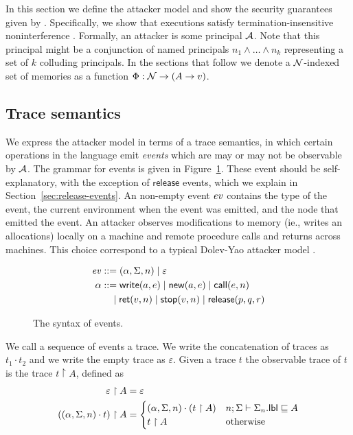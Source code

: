 In this section we define the attacker model and show the security guarantees given by \lang. Specifically, we show that \lang{} executions satisfy termination-insensitive noninterference \cite{4223226}. Formally, an attacker is some principal $\mathcal{A}$. Note that this principal might be a conjunction of named principals $n_1 \wedge \dots \wedge n_k$ representing a set of $k$ colluding principals. In the sections that follow we denote a $\mathcal{N}$-indexed set of memories as a function $\Phi: \mathcal{N} \to (A \to v)$.

\subsection{Trace semantics}
We express the attacker model in terms of a trace semantics, in which certain operations in the language emit \emph{events} which are may or may not be observable by $\mathcal{A}$. The grammar for events is given in Figure~\ref{fig:event-syntax}. These event should be self-explanatory, with the exception of $\mathsf{release}$ events, which we explain in Section~\ref{sec:release-events}. An non-empty event $\mathit{ev}$ contains the type of the event, the current environment when the event was emitted, and the node that emitted the event. An attacker observes modifications to memory (ie., writes an allocations) locally on a machine and remote procedure calls and returns across machines. This choice correspond to a typical Dolev-Yao attacker model \cite{Dolev:1981:SPK:1382435.1382728}.

\begin{figure}
\centering
\begin{align*}
\mathit{ev} &::= (\alpha, \Sigma, n) \mid \varepsilon\\
\alpha &::= \mathsf{write}(a, e) \mid \mathsf{new}(a, e) \mid \mathsf{call}(e, n) \\ &\quad \mid \mathsf{ret}(v, n) \mid \mathsf{stop}(v, n) \mid \mathsf{release}(p, q, r)
\end{align*}
\caption{The syntax of events.}
\label{fig:event-syntax}
\end{figure}

We call a sequence of events a trace. We write the concatenation of traces as $t_1 \cdot t_2$ and we write the empty trace as $\varepsilon$. Given a trace $t$ the observable trace of $t$ is the trace $t \upharpoonright A$, defined as
\begin{align*}
\varepsilon \upharpoonright A &= \varepsilon\\
((\alpha, \Sigma, n) \cdot t) \upharpoonright A &=
\begin{cases}
(\alpha, \Sigma, n) \cdot (t \upharpoonright A) & n; \Sigma \vdash \Sigma_n.\mathsf{lbl} \sqsubseteq A \\
t \upharpoonright A & \text{otherwise}
\end{cases}
\end{align*}


